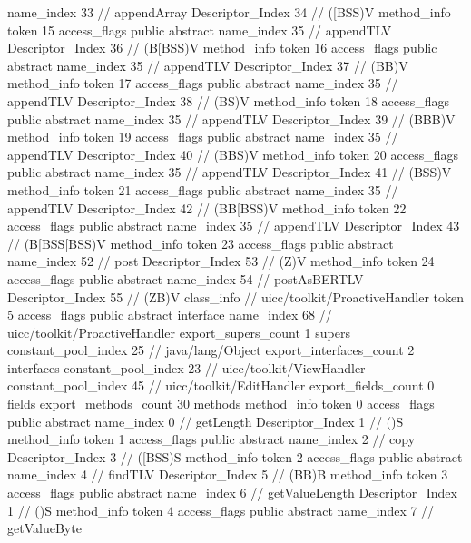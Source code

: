 {{{{{					name_index	33		// appendArray
					Descriptor_Index	34		// ([BSS)V
				}
				method_info {
					token	15
					access_flags	public abstract
					name_index	35		// appendTLV
					Descriptor_Index	36		// (B[BSS)V
				}
				method_info {
					token	16
					access_flags	public abstract
					name_index	35		// appendTLV
					Descriptor_Index	37		// (BB)V
				}
				method_info {
					token	17
					access_flags	public abstract
					name_index	35		// appendTLV
					Descriptor_Index	38		// (BS)V
				}
				method_info {
					token	18
					access_flags	public abstract
					name_index	35		// appendTLV
					Descriptor_Index	39		// (BBB)V
				}
				method_info {
					token	19
					access_flags	public abstract
					name_index	35		// appendTLV
					Descriptor_Index	40		// (BBS)V
				}
				method_info {
					token	20
					access_flags	public abstract
					name_index	35		// appendTLV
					Descriptor_Index	41		// (BSS)V
				}
				method_info {
					token	21
					access_flags	public abstract
					name_index	35		// appendTLV
					Descriptor_Index	42		// (BB[BSS)V
				}
				method_info {
					token	22
					access_flags	public abstract
					name_index	35		// appendTLV
					Descriptor_Index	43		// (B[BSS[BSS)V
				}
				method_info {
					token	23
					access_flags	public abstract
					name_index	52		// post
					Descriptor_Index	53		// (Z)V
				}
				method_info {
					token	24
					access_flags	public abstract
					name_index	54		// postAsBERTLV
					Descriptor_Index	55		// (ZB)V
				}
			}
		}
		class_info {		// uicc/toolkit/ProactiveHandler
			token	5
			access_flags	public abstract interface
			name_index	68		// uicc/toolkit/ProactiveHandler
			export_supers_count	1
			supers {
				constant_pool_index	25		// java/lang/Object
			}
			export_interfaces_count	2
			interfaces {
				constant_pool_index	23		// uicc/toolkit/ViewHandler
				constant_pool_index	45		// uicc/toolkit/EditHandler
			}
			export_fields_count	0
			fields {
			}
			export_methods_count	30
			methods {
				method_info {
					token	0
					access_flags	public abstract
					name_index	0		// getLength
					Descriptor_Index	1		// ()S
				}
				method_info {
					token	1
					access_flags	public abstract
					name_index	2		// copy
					Descriptor_Index	3		// ([BSS)S
				}
				method_info {
					token	2
					access_flags	public abstract
					name_index	4		// findTLV
					Descriptor_Index	5		// (BB)B
				}
				method_info {
					token	3
					access_flags	public abstract
					name_index	6		// getValueLength
					Descriptor_Index	1		// ()S
				}
				method_info {
					token	4
					access_flags	public abstract
					name_index	7		// getValueByte
}}}}}
